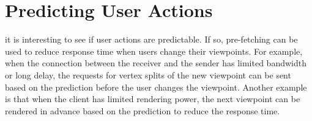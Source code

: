 
\section{Predicting User Actions}
\label{ss:user:predictability}
it is interesting to see if user actions are predictable. 
If so, pre-fetching can be used to reduce response time when
users change their viewpoints. For example, when the connection between the 
receiver and the sender has limited bandwidth
or long delay, the requests for vertex splits of the new viewpoint 
can be sent based on the prediction before the user changes the viewpoint.
Another example is that when the client has limited
rendering power, the next viewpoint can be rendered
in advance based on the prediction to reduce the response time. 

